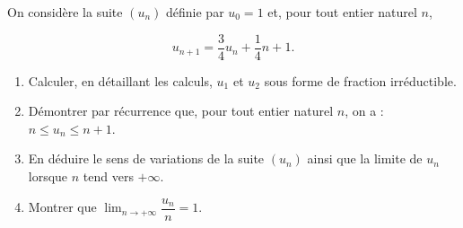 \documentclass[11pt,fleqn, openany]{book} %
\begin{document}
\begin{exercise}[topic=lim11, subtitle={(Métropole 2021)}]On considère la suite \((u_n)\) définie par \(u_0=1\) et, pour tout entier naturel \(n\),

\[u_{n+1}=\dfrac{3}{4}u_n+\dfrac{1}{4}n+1.\]
\begin{enumerate}
 	\item Calculer, en détaillant les calculs, \(u_1\) et \(u_2\) sous forme de fraction irréductible.
 	\item Démontrer par récurrence que, pour tout entier naturel \(n\), on a : \(n \leqslant u_n \leqslant n+1\).
 	\item En déduire le sens de variations de la suite \((u_n)\) ainsi que la limite de \(u_n\) lorsque \(n\) tend vers \(+\infty\).
 	\item Montrer que $\displaystyle\lim_{n \to +\infty} \dfrac{u_n}{n}=1$.
\end{enumerate}\end{exercise}
\end{document}
